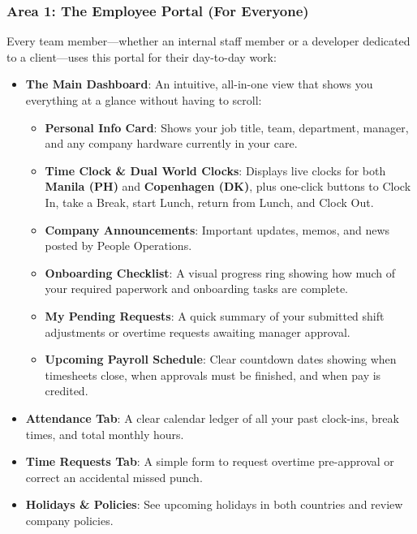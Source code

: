 \documentclass[a4paper,11pt]{article}
\begin{document}
\subsubsection{Area 1: The Employee Portal (For Everyone)}
Every team member—whether an internal staff member or a developer dedicated to a client—uses this portal for their day-to-day work:
\begin{itemize}
    \item \textbf{The Main Dashboard}:
    An intuitive, all-in-one view that shows you everything at a glance without having to scroll:
    \begin{itemize}
        \item \textbf{Personal Info Card}: Shows your job title, team, department, manager, and any company hardware currently in your care.
        \item \textbf{Time Clock \& Dual World Clocks}: Displays live clocks for both \textbf{Manila (PH)} and \textbf{Copenhagen (DK)}, plus one-click buttons to Clock In, take a Break, start Lunch, return from Lunch, and Clock Out.
        \item \textbf{Company Announcements}: Important updates, memos, and news posted by People Operations.
        \item \textbf{Onboarding Checklist}: A visual progress ring showing how much of your required paperwork and onboarding tasks are complete.
        \item \textbf{My Pending Requests}: A quick summary of your submitted shift adjustments or overtime requests awaiting manager approval.
        \item \textbf{Upcoming Payroll Schedule}: Clear countdown dates showing when timesheets close, when approvals must be finished, and when pay is credited.
    \end{itemize}
    \item \textbf{Attendance Tab}: A clear calendar ledger of all your past clock-ins, break times, and total monthly hours.
    \item \textbf{Time Requests Tab}: A simple form to request overtime pre-approval or correct an accidental missed punch.
    \item \textbf{Holidays \& Policies}: See upcoming holidays in both countries and review company policies.
\end{itemize}
\end{document}
